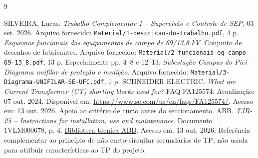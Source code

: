 \documentclass[11pt,a4paper]{article}
\begin{document}
\begin{thebibliography}{9}
 SILVEIRA, Lucas. \textit{Trabalho Complementar 1 -- Supervisão e Controle de SEP}. 03 set. 2026. Arquivo fornecido: \nolinkurl{Material/1-descricao-do-trabalho.pdf}, 4 p.
 \textit{Esquemas funcionais dos equipamentos de campo de 69/13,8 kV}. Conjunto de desenhos de fabricantes. Arquivo fornecido: \nolinkurl{Material/2-funcionais-eq-campo-69-13_8.pdf}, 13 p. Especialmente pp. 4--8 e 12--13.
 \textit{Subestação Campus do Pici -- Diagrama unifilar de proteção e medição}. Arquivo fornecido: \nolinkurl{Material/3-Diagrama-UNIFILAR-SE-UFC.pdf}, 1 p.
 SCHNEIDER ELECTRIC. \textit{What are Current Transformer (CT) shorting blocks used for?} FAQ FA125574. Atualização: 07 out. 2024. Disponível em: \url{https://www.se.com/us/en/faqs/FA125574/}. Acesso em: 13 out. 2026. Apoio ao critério de curto antes do seccionamento.
 ABB. \textit{TJR-25 -- Instructions for installation, use and maintenance}. Documento 1VLM000678, p. 4. \href{https://library.e.abb.com/public/e6e0d227ad6c4a3494ee5ea1457fda40/Instruction\%20TJR-25\%201VLM000678\%20Rev.-\%2C\%20en.pdf}{Biblioteca técnica ABB}. Acesso em: 13 out. 2026. Referência complementar ao princípio de não curto-circuitar secundários de TP; não usada para atribuir características ao TP do projeto.
\end{thebibliography}
\end{document}
